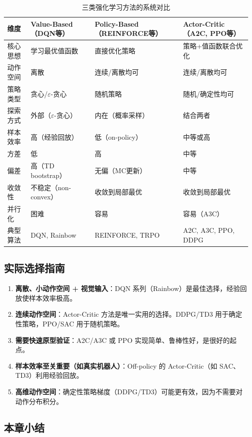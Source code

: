 \begin{table}[H]
\centering
\caption{三类强化学习方法的系统对比}
\begin{tabular}{@{}p{2.8cm}p{3.2cm}p{3.2cm}p{3.2cm}@{}}
\toprule
维度 & Value-Based（DQN等） & Policy-Based（REINFORCE等） & Actor-Critic（A2C, PPO等） \\
\midrule
核心思想 & 学习最优值函数 & 直接优化策略 & 策略+值函数联合优化 \\
动作空间 & 离散 & 连续/离散均可 & 连续/离散均可 \\
策略类型 & 贪心/$\varepsilon$-贪心 & 随机策略 & 随机/确定性均可 \\
探索方式 & 外部（$\varepsilon$-贪心） & 内在（概率采样） & 结合两者 \\
样本效率 & 高（经验回放） & 低（on-policy） & 中等或高 \\
方差 & 低 & 高 & 中等 \\
偏差 & 高（TD bootstrap） & 无偏（MC更新） & 中等 \\
收敛性 & 不稳定（non-convex） & 收敛到局部最优 & 收敛到局部最优 \\
并行化 & 困难 & 容易 & 容易（A3C） \\
典型算法 & DQN, Rainbow & REINFORCE, TRPO & A2C, A3C, PPO, DDPG \\
\bottomrule
\end{tabular}
\end{table}

\subsection{实际选择指南}

\begin{enumerate}
    \item \textbf{离散、小动作空间 + 视觉输入}：DQN 系列（Rainbow）是最佳选择，经验回放使样本效率极高。
    \item \textbf{连续动作空间}：Actor-Critic 方法是唯一实用的选择。DDPG/TD3 用于确定性策略，PPO/SAC 用于随机策略。
    \item \textbf{需要快速原型验证}：A2C/A3C 或 PPO 实现简单、鲁棒性好，是很好的起点。
    \item \textbf{样本效率至关重要（如真实机器人）}：Off-policy 的 Actor-Critic（如 SAC、TD3）利用经验回放。
    \item \textbf{高维动作空间}：确定性策略梯度（DDPG/TD3）可能更有效，因为不需要对动作分布积分。
\end{enumerate}

\subsection{本章小结}

